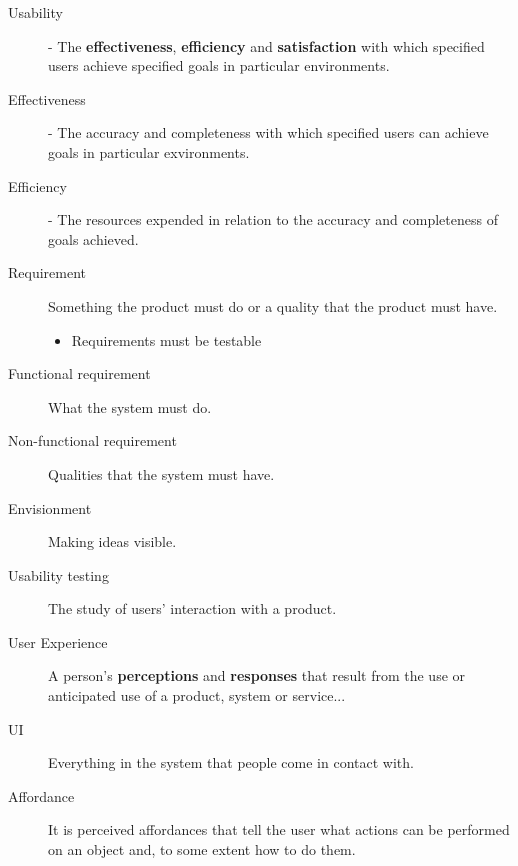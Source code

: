 \begin{description}
	\item[Usability] - The \textbf{effectiveness}, \textbf{efficiency} and \textbf{satisfaction} with which specified users achieve specified goals in particular environments.
	\item[Effectiveness] - The accuracy and completeness with which specified users can achieve goals in particular exvironments.
	\item[Efficiency] - The resources expended in relation to the accuracy and completeness of goals achieved.
	\item[Requirement] Something the product must do or a quality that the product must have.
	\begin{itemize}
		\item Requirements must be testable
	\end{itemize}
	\item[Functional requirement] What the system must do.
	\item[Non-functional requirement] Qualities that the system must have.
	\item[Envisionment] Making ideas visible.
	\item[Usability testing] The study of users' interaction with a product.
	\item[User Experience] A person's \textbf{perceptions} and \textbf{responses} that result from the use or anticipated use of a product, system or service...
	\item[UI] Everything in the system that people come in contact with.
	\item[Affordance] It is perceived affordances that tell the user what actions can be performed on an object and, to some extent how to do them.
\end{description} 